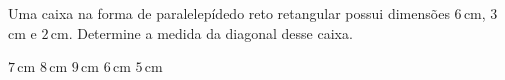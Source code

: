 Uma caixa na forma de paralelepídedo reto retangular possui dimensões $6$\,cm, $3$\,cm e $2$\,cm. Determine a medida da diagonal desse caixa.

$7$\,cm
$8$\,cm
$9$\,cm
$6$\,cm
$5$\,cm



